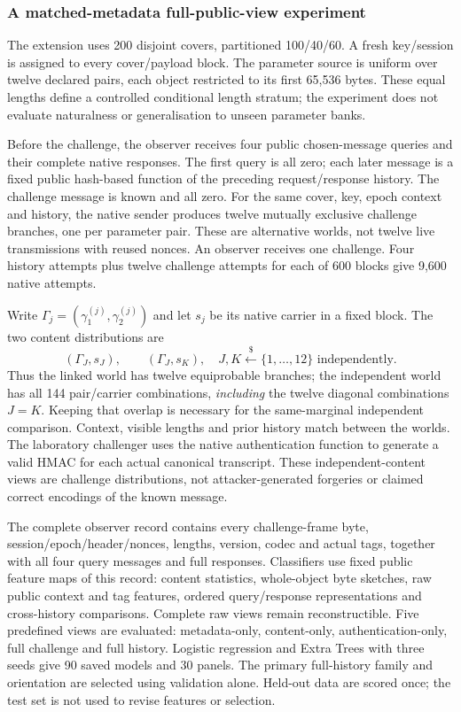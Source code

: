 \documentclass[pdflatex,sn-mathphys-num]{sn-jnl}%
\theoremstyle{definition}
\theoremstyle{game}
\theoremstyle{thmstyleone}%
\theoremstyle{thmstyletwo}%
\theoremstyle{thmstylethree}%
\begin{document}
\subsubsection{A matched-metadata full-public-view experiment}
\label{subsec:fullview-cpunl}
The extension uses 200 disjoint covers, partitioned
100/40/60. A fresh key/session is assigned to every cover/payload block.
The parameter source is uniform over twelve declared pairs, each object
restricted to its first 65,536 bytes. These equal lengths define a
controlled conditional length stratum; the experiment does not evaluate
naturalness or generalisation to unseen parameter banks.

Before the challenge, the observer receives four public chosen-message
queries and their complete native responses. The first query is all
zero; each later message is a fixed public hash-based function of the
preceding request/response history. The challenge message is known and
all zero. For the same cover, key, epoch context and history, the native
sender produces twelve mutually exclusive challenge branches, one per
parameter pair. These are alternative worlds, not twelve live
transmissions with reused nonces. An observer receives one challenge.
Four history attempts plus twelve challenge attempts for each of 600
blocks give 9,600 native attempts.

Write $\Gamma_j=(\gamma_1^{(j)},\gamma_2^{(j)})$ and let $s_j$ be its
native carrier in a fixed block. The two content distributions are
\[
 (\Gamma_J,s_J),\qquad
 (\Gamma_J,s_K),\quad J,K\stackrel{\$}{\leftarrow}\{1,\ldots,12\}
 \text{ independently}.
\]
Thus the linked world has twelve equiprobable branches; the independent
world has all 144 pair/carrier combinations, \emph{including} the twelve
diagonal combinations $J=K$. Keeping that overlap is necessary for the
same-marginal independent comparison. Context, visible lengths and prior
history match between the worlds. The laboratory challenger uses the
native authentication function to generate a valid HMAC for each actual
canonical transcript. These independent-content views are challenge
distributions, not attacker-generated forgeries or claimed correct
encodings of the known message.

The complete observer record contains every challenge-frame byte,
session/epoch/header/nonces, lengths, version, codec and actual tags,
together with all four query messages and full responses. Classifiers
use fixed public feature maps of this record: content statistics,
whole-object byte sketches, raw public context and tag features, ordered
query/response representations and cross-history comparisons. Complete
raw views remain reconstructible. Five predefined views are evaluated:
metadata-only, content-only, authentication-only, full challenge and
full history. Logistic regression and Extra Trees with three seeds give
90 saved models and 30 panels. The primary full-history family and
orientation are selected using validation alone. Held-out data are
scored once; the test set is not used to revise features or selection.
\end{document}

